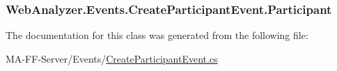\subsubsection[{Participant}]{ Web\+Analyzer.\+Events.\+Create\+Participant\+Event.\+Participant\hspace{0.3cm}{\ttfamily [get]}}\label{class_web_analyzer_1_1_events_1_1_create_participant_event_a33ceb02517db8c73eac1753aedc7823c}


The documentation for this class was generated from the following file\+:\begin{DoxyCompactItemize}
\item 
M\+A-\/\+F\+F-\/\+Server/\+Events/\hyperlink{_create_participant_event_8cs}{Create\+Participant\+Event.\+cs}\end{DoxyCompactItemize}
